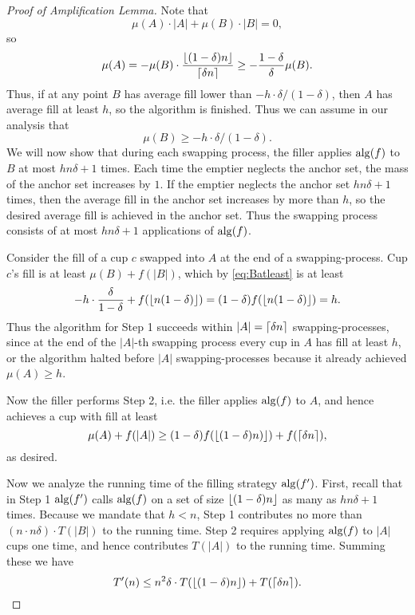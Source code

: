 \begin{proof}[Proof of Amplification Lemma]
  Note that $$\mu(A) \cdot |A| + \mu(B)\cdot |B| = 0,$$ so
  $$\mu(A) = - \mu(B) \cdot
  \frac{\left\lfloor (1-\delta)n \right\rfloor}{\left\lceil \delta n \right\rceil} \ge -
  \frac{1-\delta}{\delta} \mu(B).$$ Thus, if at any
  point $B$ has average fill lower than $-h \cdot
  \delta/(1-\delta)$, then $A$ has average fill at least $h$, so
  the algorithm is finished. Thus we can assume in our analysis that
  \begin{equation}
    \mu(B) \ge -h\cdot\delta/(1-\delta).
  \label{eq:Batleast}
  \end{equation}
  We will now show that during each swapping process, the filler
  applies $\operatorname{\text{\textup{alg}}}(f)$ to $B$ at most $h n \delta + 1$ times. 
  Each time the emptier neglects the anchor set, the mass of the
  anchor set increases by $1$. If the emptier neglects the anchor set $h
  n\delta + 1$ times, then the average fill in the anchor set increases by
  more than $h$, so the desired average fill is achieved in the
  anchor set. Thus the swapping process consists of at most
  $hn\delta + 1$ applications of $\operatorname{\text{\textup{alg}}}(f)$.  

  Consider the fill of a cup $c$ swapped into $A$ at the end of a
  swapping-process. Cup $c$'s fill is at least $\mu(B) + f(|B|)$,
  which by \eqref{eq:Batleast} is at least
  $$-h \cdot \frac{\delta}{1-\delta} + f(\left\lfloor n (1-\delta) \right\rfloor) =
  (1-\delta)f(\left\lfloor n (1-\delta) \right\rfloor) = h.$$ 
  Thus the algorithm for Step 1 succeeds within $|A| =
  \left\lceil \delta n \right\rceil$ swapping-processes, since at the end of the $|A|$-th
  swapping process every cup in $A$ has fill at least $h$, or
  the algorithm halted before $|A|$ swapping-processes because it
  already achieved $\mu(A) \ge h$. 
  
  Now the filler performs Step 2, i.e. the filler applies
  $\operatorname{\text{\textup{alg}}}(f)$ to $A$, and hence achieves a cup with fill at least 
  $$\mu(A) + f(|A|) \ge (1-\delta)f(\left\lfloor (1-\delta)n) \right\rfloor) + f(\left\lceil \delta n \right\rceil),$$
  as desired.

  Now we analyze the running time of the filling strategy
  $\operatorname{\text{\textup{alg}}}(f')$. First, recall that in Step 1 $\operatorname{\text{\textup{alg}}}(f')$ calls $\operatorname{\text{\textup{alg}}}(f)$ on a
  set of size $\left\lfloor (1-\delta)n \right\rfloor$ as many as $hn\delta +1$ times.
  Because we mandate that $h < n$, Step 1 contributes no more
  than $(n\cdot n\delta) \cdot T(|B|)$ to the running time.
  Step 2 requires applying $\operatorname{\text{\textup{alg}}}(f)$ to $|A|$ cups one time, and hence
  contributes $T(|A|)$ to the running time. Summing these we have
  $$T'(n) \le n^2\delta \cdot T(\left\lfloor (1-\delta)n \right\rfloor) + T(\left\lceil \delta n \right\rceil).$$

\end{proof}

